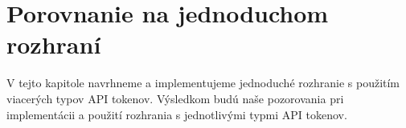 \chapter{Porovnanie na jednoduchom rozhraní}

\label{kap:rozhranie} %

V tejto kapitole navrhneme a implementujeme jednoduché rozhranie s použitím viacerých typov API tokenov. Výsledkom budú naše pozorovania pri implementácii a použití rozhrania s jednotlivými typmi API tokenov.